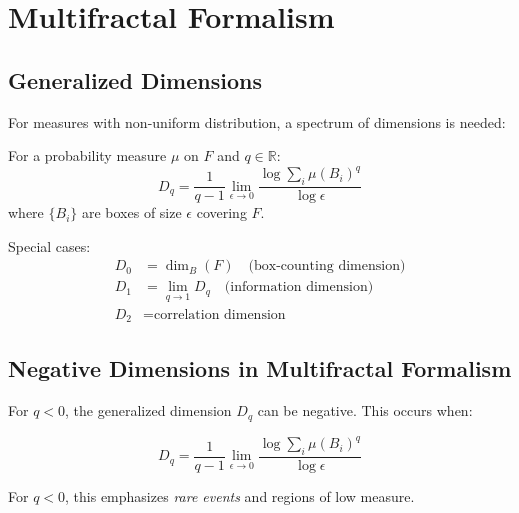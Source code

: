 \section{Multifractal Formalism}

\subsection{Generalized Dimensions}

For measures with non-uniform distribution, a spectrum of dimensions is needed:

\begin{definition}
For a probability measure $\mu$ on $F$ and $q \in \mathbb{R}$:
\begin{equation}
    D_q = \frac{1}{q-1} \lim_{\epsilon \to 0} \frac{\log \sum_i \mu(B_i)^q}{\log \epsilon}
\end{equation}
where $\{B_i\}$ are boxes of size $\epsilon$ covering $F$.
\end{definition}

Special cases:
\begin{align}
    D_0 &= \dim_B(F) \quad \text{(box-counting dimension)} \\
    D_1 &= \lim_{q \to 1} D_q \quad \text{(information dimension)} \\
    D_2 &= \text{correlation dimension}
\end{align}

\subsection{Negative Dimensions in Multifractal Formalism}

For $q < 0$, the generalized dimension $D_q$ can be negative. This occurs when:

\begin{equation}
    D_q = \frac{1}{q-1} \lim_{\epsilon \to 0} \frac{\log \sum_i \mu(B_i)^q}{\log \epsilon}
\end{equation}

For $q < 0$, this emphasizes \textit{rare events} and regions of low measure.

